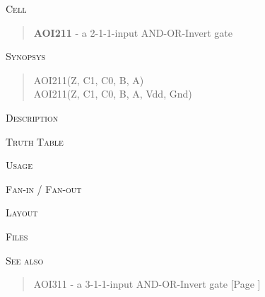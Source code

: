 
\label{AOI211}
\textsc{Cell}
\begin{quote}
    \textbf{AOI211} - a 2-1-1-input AND-OR-Invert gate
\end{quote}

\textsc{Synopsys}
\begin{quote}
    AOI211(Z, C1, C0, B, A) \\
    AOI211(Z, C1, C0, B, A, Vdd, Gnd)
\end{quote}

\textsc{Description}

%

\textsc{Truth Table}


\textsc{Usage}

\textsc{Fan-in / Fan-out}

\textsc{Layout}

\textsc{Files}

\textsc{See also}
\begin{quote}
    AOI311 - a 3-1-1-input AND-OR-Invert gate [Page \pageref{AOI311}]
\end{quote}
